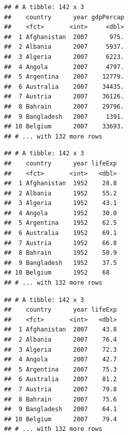 \documentclass[12pt,]{article}
\newenvironment{Shaded}{\begin{snugshade}}{\end{snugshade}}
\newcommand{\KeywordTok}[1]{\textcolor[rgb]{0.13,0.29,0.53}{\textbf{#1}}}
\newcommand{\DecValTok}[1]{\textcolor[rgb]{0.00,0.00,0.81}{#1}}
\newcommand{\StringTok}[1]{\textcolor[rgb]{0.31,0.60,0.02}{#1}}
\newcommand{\OperatorTok}[1]{\textcolor[rgb]{0.81,0.36,0.00}{\textbf{#1}}}
\newcommand{\NormalTok}[1]{#1}
\begin{document}
\begin{verbatim}
## # A tibble: 142 x 3
##    country      year gdpPercap
##    <fct>       <int>     <dbl>
##  1 Afghanistan  2007      975.
##  2 Albania      2007     5937.
##  3 Algeria      2007     6223.
##  4 Angola       2007     4797.
##  5 Argentina    2007    12779.
##  6 Australia    2007    34435.
##  7 Austria      2007    36126.
##  8 Bahrain      2007    29796.
##  9 Bangladesh   2007     1391.
## 10 Belgium      2007    33693.
## # ... with 132 more rows
\end{verbatim}

\begin{Shaded}
\end{Shaded}

\begin{verbatim}
## # A tibble: 142 x 3
##    country      year lifeExp
##    <fct>       <int>   <dbl>
##  1 Afghanistan  1952    28.8
##  2 Albania      1952    55.2
##  3 Algeria      1952    43.1
##  4 Angola       1952    30.0
##  5 Argentina    1952    62.5
##  6 Australia    1952    69.1
##  7 Austria      1952    66.8
##  8 Bahrain      1952    50.9
##  9 Bangladesh   1952    37.5
## 10 Belgium      1952    68  
## # ... with 132 more rows
\end{verbatim}

\begin{Shaded}
\end{Shaded}

\begin{verbatim}
## # A tibble: 142 x 3
##    country      year lifeExp
##    <fct>       <int>   <dbl>
##  1 Afghanistan  2007    43.8
##  2 Albania      2007    76.4
##  3 Algeria      2007    72.3
##  4 Angola       2007    42.7
##  5 Argentina    2007    75.3
##  6 Australia    2007    81.2
##  7 Austria      2007    79.8
##  8 Bahrain      2007    75.6
##  9 Bangladesh   2007    64.1
## 10 Belgium      2007    79.4
## # ... with 132 more rows
\end{verbatim}
\end{document}
